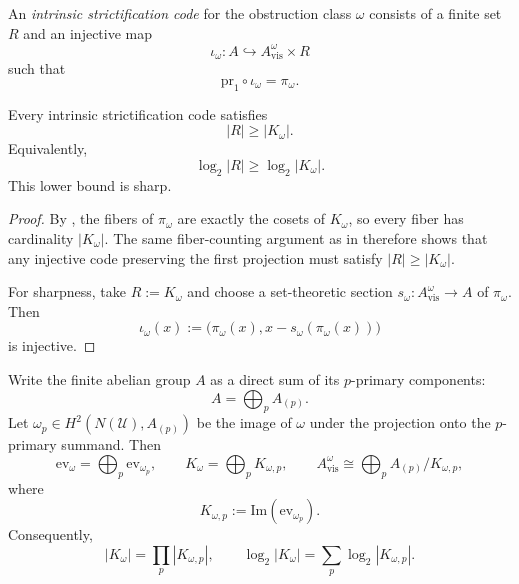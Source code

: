 \begin{definition}\label{def:intrinsic-strictification-code}
An \emph{intrinsic strictification code} for the obstruction class $\omega$ consists of a finite set $R$ and an injective map
\[
\iota_{\omega}:A\hookrightarrow A_{\mathrm{vis}}^{\omega}\times R
\]
such that
\[
\mathrm{pr}_1\circ\iota_{\omega}=\pi_{\omega}.
\]
\end{definition}

\begin{corollary}\label{cor:intrinsic-hidden-state-lower-bound}
Every intrinsic strictification code satisfies
\[
|R|\ge |K_{\omega}|.
\]
Equivalently,
\[
\log_2|R|\ge \log_2|K_{\omega}|.
\]
This lower bound is sharp.
\end{corollary}

\begin{proof}
By , the fibers of $\pi_{\omega}$ are exactly the cosets of $K_{\omega}$, so every fiber has cardinality $|K_{\omega}|$. The same fiber-counting argument as in  therefore shows that any injective code preserving the first projection must satisfy $|R|\ge |K_{\omega}|$.

For sharpness, take $R:=K_{\omega}$ and choose a set-theoretic section $s_{\omega}:A_{\mathrm{vis}}^{\omega}\to A$ of $\pi_{\omega}$. Then
\[
\iota_{\omega}(x):=\bigl(\pi_{\omega}(x),x-s_{\omega}(\pi_{\omega}(x))\bigr)
\]
is injective.
\end{proof}

\begin{theorem}\label{thm:intrinsic-prime-decomposition}
Write the finite abelian group $A$ as a direct sum of its $p$-primary components:
\[
A=\bigoplus_p A_{(p)}.
\]
Let $\omega_p\in H^2(N(\mathcal U),A_{(p)})$ be the image of $\omega$ under the projection onto the $p$-primary summand. Then
\[
\mathrm{ev}_{\omega}=\bigoplus_p \mathrm{ev}_{\omega_p},
\qquad
K_{\omega}=\bigoplus_p K_{\omega,p},
\qquad
A_{\mathrm{vis}}^{\omega}\cong \bigoplus_p A_{(p)}/K_{\omega,p},
\]
where
\[
K_{\omega,p}:=\mathrm{Im}(\mathrm{ev}_{\omega_p}).
\]
Consequently,
\[
|K_{\omega}|=\prod_p |K_{\omega,p}|,
\qquad
\log_2|K_{\omega}|=\sum_p \log_2|K_{\omega,p}|.
\]
\end{theorem}

